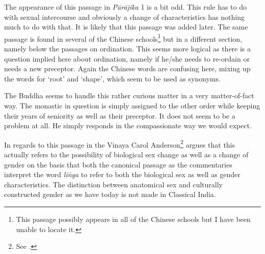 The appearance of this passage in {\em Pārājika} 1 is a bit odd. This rule has to do with sexual intercourse and obviously a change of characteristics has nothing much to do with that. It is likely that this passage was added later. The same passage is found in several of the Chinese schools\footnote{This passage possibly appears in all of the Chinese schools but I have been unable to locate it.} but in a different section, namely below the passages on ordination. This seems more logical as there is a question implied here about ordination, namely if he/she needs to re-ordain or needs a new preceptor. Again the Chinese words are confusing here, mixing up the words for `root' and `shape', which seem to be used as synonyms.

The Buddha seems to handle this rather curious matter in a very matter-of-fact way. The monastic in question is simply assigned to the other order while keeping their years of seniority as well as their preceptor. It does not seem to be a problem at all. He simply responds in the compassionate way we would expect.

In regards to this passage in the Vinaya Carol Anderson\footnote{See \cite{anderson2016a}.} argues that this actually refers to the possibility of biological sex change as well as a change of gender on the basis that both the canonical passage as the commentaries interpret the word {\em liṅga} to refer to both the biological sex as well as gender characteristics. The distinction between anatomical sex and culturally constructed gender as we have today is not made in Classical India.

